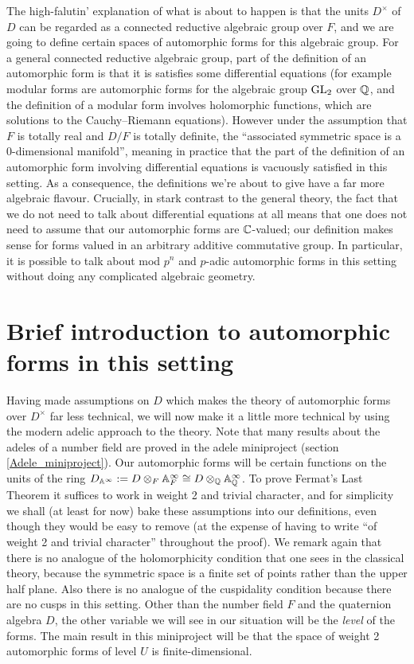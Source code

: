 The high-falutin' explanation of what is about to happen is that the units $D^\times$ of $D$
can be regarded as a connected reductive algebraic group over $F$, and we are going to define certain spaces
of automorphic forms for this algebraic group. For a general connected reductive algebraic group,
part of the definition of an automorphic form is that it is satisfies some differential
equations (for example modular forms are automorphic forms for the algebraic group $\operatorname{GL}_2$ over
$\mathbb{Q}$, and the definition of a modular form involves holomorphic functions, which are solutions to
the Cauchy--Riemann equations). However under the assumption that $F$ is totally real and $D/F$ is
totally definite, the ``associated symmetric space is a 0-dimensional manifold'', meaning in practice that
the part of the definition of an automorphic form involving differential equations is vacuously satisfied in this setting.
As a consequence, the definitions we're about to give have a far more algebraic flavour. Crucially, in stark
contrast to the general theory, the fact that we do not need to talk about differential equations at all means that one does
not need to assume that our automorphic forms are $\mathbb{C}$-valued; our definition makes sense for forms valued in an arbitrary additive commutative group.
In particular, it is possible to talk about mod $p^n$ and $p$-adic automorphic forms in this setting without doing any complicated algebraic geometry.

\section{Brief introduction to automorphic forms in this setting}

Having made assumptions on $D$ which makes the theory of automorphic forms over $D^\times$
far less technical, we will now make it a little more technical by using the modern adelic
approach to the theory. Note that many results about the adeles of a number field are proved
in the adele miniproject (section \ref{Adele_miniproject}). Our automorphic forms will be certain
functions on the units of the ring $D_{\mathbb{A}^\infty}:=D\otimes_F\mathbb{A}_F^\infty\cong D\otimes_{\mathbb{Q}}\mathbb{A}_{\mathbb{Q}}^\infty$.
To prove Fermat's Last Theorem it suffices to work in weight 2 and trivial character, and for simplicity we shall (at least for now)
bake these assumptions into our definitions, even though they would be easy to remove (at the expense of having
to write ``of weight 2 and trivial character'' throughout the proof). We remark again that
there is no analogue of the holomorphicity condition that one sees in the classical theory,
because the symmetric space is a finite set of points rather than the upper half plane. Also
there is no analogue of the cuspidality condition because there are no cusps in this setting.
Other than the number field $F$ and the quaternion algebra $D$, the other variable we will see in our situation
will be the \emph{level} of the forms. The main result in this miniproject will be that the space of weight 2 automorphic forms of level $U$
is finite-dimensional.


